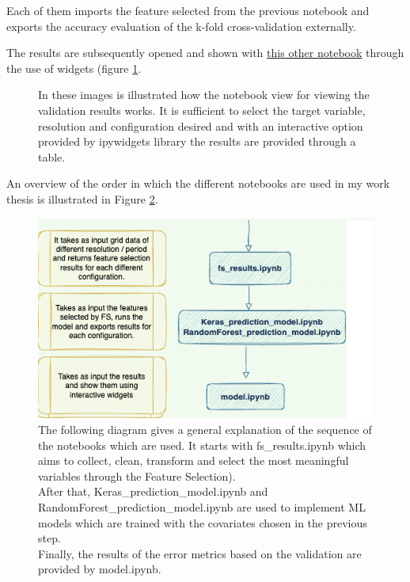 Each of them imports the feature selected from the previous notebook and exports the accuracy evaluation of the k-fold cross-validation externally. \par
The results are subsequently opened and shown with \href{https://github.com/opengeolab/D-DUST/blob/thesis_MB/notebooks/model.ipynb}{this other notebook} through the use of widgets (figure \ref{fig:view}.
\begin{figure}[H] 
    \centering
    \hfill%
    \caption{In these images is illustrated how the notebook view for viewing the validation results works. It is sufficient to select the target variable, resolution and configuration desired and with an interactive option provided by ipywidgets library the results are provided through a table.}
    \label{fig:view}
\end{figure}

An overview of the order in which the different notebooks are used in my work thesis is illustrated in Figure \ref{fig:notebooks}.
\begin{figure}[H]
    \centering
    \includegraphics[scale=0.40]{images/overview _notebooks.png}
    \caption{The following diagram gives a general explanation of the sequence of the notebooks which are used. It starts with fs\_results.ipynb which aims to collect, clean, transform and select the most meaningful variables through the Feature Selection). \\
    After that, Keras\_prediction\_model.ipynb and RandomForest\_prediction\_model.ipynb are used to implement ML models which are trained with the covariates chosen in the previous step. \\
    Finally, the results of the error metrics based on the validation are provided by model.ipynb. }
    \label{fig:notebooks}
\end{figure}